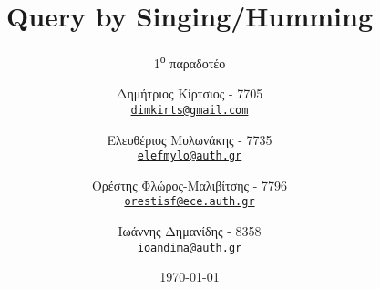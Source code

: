 

\subject{Τεχνολογία του Ήχου και της Εικόνας}
\title{Query by Singing/Humming}
\subtitle{1\textsuperscript{ο} παραδοτέο}
\author{
	Δημήτριος Κίρτσιος - 7705\\ \texttt{\href{mailto:dimkirts@gmail.com}{dimkirts@gmail.com}}
	\and Ελευθέριος Μυλωνάκης - 7735\\ \texttt{\href{mailto:elefmylo@auth.gr}{elefmylo@auth.gr}}
	\and Ορέστης Φλώρος-Μαλιβίτσης - 7796\\ \texttt{\href{mailto:orestisf@ece.auth.gr}{orestisf@ece.auth.gr}}
	\and Ιωάννης Δημανίδης - 8358\\ \texttt{\href{mailto:ioandima@auth.gr}{ioandima@auth.gr}}
}
\date{\vspace{10cm}\today}


	\maketitle
	\tableofcontents
	\clearpage
	\setcounter{page}{1}

		
    
		
    
    
	

    

